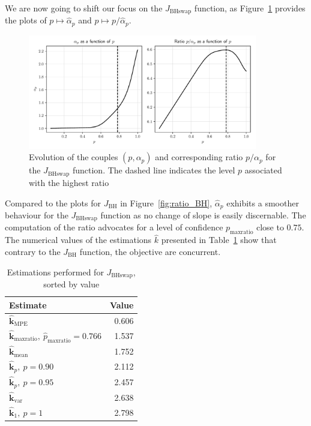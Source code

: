 \documentclass[preprint, 1p]{elsarticle}
\newcommand{\kest}{\hat{\mathbf{k}}}
\newcommand{\checkap}{{\alpha}_p}
\newcommand{\checka}{{\alpha}}
\begin{document}
We are now going to shift our focus on the $J_{\mathrm{BHswap}}$ function, as Figure~\ref{fig:ratio_BHs} provides the plots of $p\mapsto \hat{\checka}_p$ and $p\mapsto p/\hat{\checka}_p$.
\begin{figure}[ht]
  \centering
\includegraphics[width=10cm]{Figures/alpha_p_BHs.pdf}
\caption{Evolution of the couples $(p,\checkap)$ and corresponding ratio $p/\checkap$ for the $J_{\mathrm{BHswap}}$ function. The dashed line indicates the level $p$ associated with the highest ratio}
\label{fig:ratio_BHs}
\end{figure}

Compared to the plots for $J_{\mathrm{BH}}$ in Figure~\ref{fig:ratio_BH}, $\hat{\checka}_p$ exhibits a smoother behaviour for the $J_{\mathrm{BHswap}}$ function as no change of slope is easily discernable. The computation of the ratio advocates for a level of confidence $p_{\mathrm{maxratio}}$ close to $0.75$. The numerical values of the estimations $\hat{k}$ presented in Table~\ref{tab:recap_estimates_BHs} show that contrary to the $J_{\mathrm{BH}}$ function, the objective are concurrent.

\begin{table}[!h]
\centering
\caption{Estimations performed for $J_{\mathrm{BHswap}}$, sorted by value}
\label{tab:recap_estimates_BHs}
\begin{tabular}{lr} \toprule
Estimate & Value \\ \midrule
$\kest_{\mathrm{MPE}}$ & 0.606 \\ 
$\kest_{\mathrm{maxratio}},~ \hat{p}_{\mathrm{maxratio}}=0.766$ & 1.537 \\ 
$\kest_{\mathrm{mean}}$ & 1.752 \\ 
$\kest_p,~p=0.90$ & 2.112 \\ 
$\kest_p,~p=0.95$ & 2.457 \\ 
$\kest_{\mathrm{var}}$ & 2.638 \\ 
$\kest_1,~p=1$ & 2.798   \\ \bottomrule
\end{tabular}
\end{table}
\end{document}
